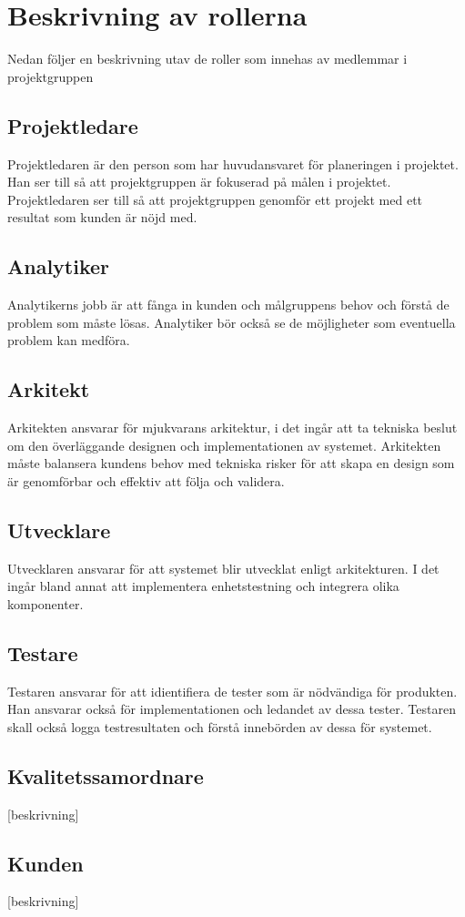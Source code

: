 \section{Beskrivning av rollerna}
Nedan följer en beskrivning utav de roller som innehas av medlemmar i projektgruppen
\subsection*{Projektledare}
Projektledaren är den person som har huvudansvaret för planeringen i projektet. Han ser till så att projektgruppen är fokuserad på målen i projektet. Projektledaren ser till så att projektgruppen genomför ett projekt med ett resultat som kunden är nöjd med.
\subsection*{Analytiker}
Analytikerns jobb är att fånga in kunden och målgruppens behov och förstå de problem som måste lösas. Analytiker bör också se de möjligheter som eventuella problem kan medföra.
\subsection*{Arkitekt}
Arkitekten ansvarar för mjukvarans arkitektur, i det ingår att ta tekniska beslut om den överläggande designen och implementationen av systemet. Arkitekten måste balansera kundens behov med tekniska risker för att skapa en design som är genomförbar och effektiv att följa och validera.
\subsection*{Utvecklare}
Utvecklaren ansvarar för att systemet blir utvecklat enligt arkitekturen. I det ingår bland annat att implementera enhetstestning och integrera olika komponenter.
\subsection*{Testare}
Testaren ansvarar för att idientifiera de tester som är nödvändiga för produkten. Han ansvarar också för implementationen och ledandet av dessa tester. Testaren skall också logga testresultaten och förstå innebörden av dessa för systemet.
\subsection*{Kvalitetssamordnare}
[beskrivning]
\subsection*{Kunden}
[beskrivning]
